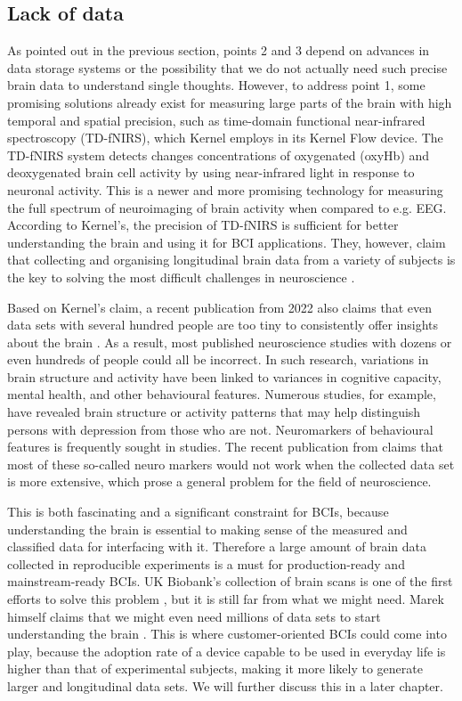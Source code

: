 \subsection{Lack of data}
\label{chapter2-lack-of-data}

As pointed out in the previous section, points 2 and 3 depend on advances in data storage systems or the possibility that we do not actually need such precise brain data to understand single thoughts. However, to address point 1, some promising solutions already exist for measuring large parts of the brain with high temporal and spatial precision, such as time-domain functional near-infrared spectroscopy (TD-fNIRS), which Kernel employs in its Kernel Flow device. The TD-fNIRS system detects changes concentrations of oxygenated (oxyHb) and deoxygenated brain cell activity by using near-infrared light in response to neuronal activity. This is a newer and more promising technology for measuring the full spectrum of neuroimaging of brain activity when compared to e.g. EEG. According to Kernel's, the precision of TD-fNIRS is sufficient for better understanding the brain and using it for BCI applications. They, however, claim that collecting and organising longitudinal brain data from a variety of subjects is the key to solving the most difficult challenges in neuroscience \citep{kernel_hello-humanitypdf_nodate}.

Based on Kernel's claim, a recent publication from 2022 also claims that even data sets with several hundred people are too tiny to consistently offer insights about the brain \citep{marek_reproducible_2022}. As a result, most published neuroscience studies with dozens or even hundreds of people could all be incorrect. In such research, variations in brain structure and activity have been linked to variances in cognitive capacity, mental health, and other behavioural features. Numerous studies, for example, have revealed brain structure or activity patterns that may help distinguish persons with depression from those who are not. Neuromarkers of behavioural features is frequently sought in studies. The recent publication from \citeauthor{marek_reproducible_2022} claims that most of these so-called neuro markers would not work when the collected data set is more extensive, which prose a general problem for the field of neuroscience.

This is both fascinating and a significant constraint for BCIs, because understanding the brain is essential to making sense of the measured and classified data for interfacing with it. Therefore a large amount of brain data collected in reproducible experiments is a must for production-ready and mainstream-ready BCIs. UK Biobank's collection of brain scans is one of the first efforts to solve this problem \citep{noauthor_imaging_nodate}, but it is still far from what we might need. Marek himself claims that we might even need millions of data sets to start understanding the brain \citep{callaway_can_2022}. This is where customer-oriented BCIs could come into play, because the adoption rate of a device capable to be used in everyday life is higher than that of experimental subjects, making it more likely to generate larger and longitudinal data sets. We will further discuss this in a later chapter.

